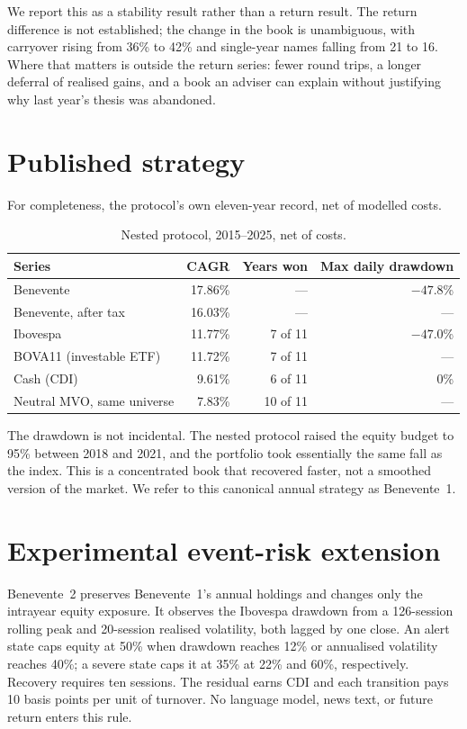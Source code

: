 \documentclass[10pt,conference]{IEEEtran}
\begin{document}
We report this as a stability result rather than a return result. The return difference is not established; the change
in the book is unambiguous, with carryover rising from 36\% to 42\% and single-year names falling from 21 to 16. Where
that matters is outside the return series: fewer round trips, a longer deferral of realised gains, and a book an
adviser can explain without justifying why last year's thesis was abandoned.

\section{Published strategy}

For completeness, the protocol's own eleven-year record, net of modelled costs.

\begin{table}[t]
\caption{Nested protocol, 2015--2025, net of costs.}
\centering
\begin{tabular}{lrrr}
\toprule
Series & CAGR & Years won & Max daily drawdown \\
\midrule
Benevente & 17.86\% & --- & $-47.8$\% \\
Benevente, after tax & 16.03\% & --- & --- \\
Ibovespa & 11.77\% & 7 of 11 & $-47.0$\% \\
BOVA11 (investable ETF) & 11.72\% & 7 of 11 & --- \\
Cash (CDI) & 9.61\% & 6 of 11 & 0\% \\
Neutral MVO, same universe & 7.83\% & 10 of 11 & --- \\
\bottomrule
\end{tabular}
\label{tab:published}
\end{table}

The drawdown is not incidental. The nested protocol raised the equity budget to 95\% between 2018 and 2021, and the portfolio took essentially the same fall as the index. This is a concentrated book that recovered faster, not a smoothed version of the market. We refer to this canonical annual strategy as Benevente~1.

\section{Experimental event-risk extension}

Benevente~2 preserves Benevente~1's annual holdings and changes only the intrayear equity exposure. It observes the Ibovespa drawdown from a 126-session rolling peak and 20-session realised volatility, both lagged by one close. An alert state caps equity at 50\% when drawdown reaches 12\% or annualised volatility reaches 40\%; a severe state caps it at 35\% at 22\% and 60\%, respectively. Recovery requires ten sessions. The residual earns CDI and each transition pays 10 basis points per unit of turnover. No language model, news text, or future return enters this rule.
\end{document}
